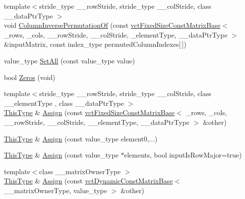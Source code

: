 \begin{DoxyCompactItemize}
\item 
{\footnotesize template$<$stride\+\_\+type \+\_\+\+\_\+row\+Stride, stride\+\_\+type \+\_\+\+\_\+col\+Stride, class \+\_\+\+\_\+data\+Ptr\+Type $>$ }\\void \hyperlink{classvct_fixed_size_matrix_base_a7cc425e8426d9b6e05e73879b0eeb7fc}{Column\+Inverse\+Permutation\+Of} (const \hyperlink{classvct_fixed_size_const_matrix_base}{vct\+Fixed\+Size\+Const\+Matrix\+Base}$<$ \+\_\+rows, \+\_\+cols, \+\_\+\+\_\+row\+Stride, \+\_\+\+\_\+col\+Stride, \+\_\+element\+Type, \+\_\+\+\_\+data\+Ptr\+Type $>$ \&input\+Matrix, const index\+\_\+type permuted\+Column\+Indexes\mbox{[}$\,$\mbox{]})
\item 
value\+\_\+type \hyperlink{classvct_fixed_size_matrix_base_af32801fac5457ee53971dd5732aaaf30}{Set\+All} (const value\+\_\+type value)
\item 
bool \hyperlink{classvct_fixed_size_matrix_base_a28dd9c3f149dbd21dc91943fb51d88f0}{Zeros} (void)
\item 
{\footnotesize template$<$stride\+\_\+type \+\_\+\+\_\+row\+Stride, stride\+\_\+type \+\_\+\+\_\+col\+Stride, class \+\_\+\+\_\+element\+Type , class \+\_\+\+\_\+data\+Ptr\+Type $>$ }\\\hyperlink{classvct_fixed_size_const_matrix_base_a7ec66a96ed7e08ce9ff54093133c9d8d}{This\+Type} \& \hyperlink{classvct_fixed_size_matrix_base_a1bf6174aa97f71d7d33df7a92a368683}{Assign} (const \hyperlink{classvct_fixed_size_const_matrix_base}{vct\+Fixed\+Size\+Const\+Matrix\+Base}$<$ \+\_\+rows, \+\_\+cols, \+\_\+\+\_\+row\+Stride, \+\_\+\+\_\+col\+Stride, \+\_\+\+\_\+element\+Type, \+\_\+\+\_\+data\+Ptr\+Type $>$ \&other)
\item 
\hyperlink{classvct_fixed_size_const_matrix_base_a7ec66a96ed7e08ce9ff54093133c9d8d}{This\+Type} \& \hyperlink{classvct_fixed_size_matrix_base_a6835ab7809fcc7ff91ad04ff138ce427}{Assign} (const value\+\_\+type element0,...)
\item 
\hyperlink{classvct_fixed_size_const_matrix_base_a7ec66a96ed7e08ce9ff54093133c9d8d}{This\+Type} \& \hyperlink{classvct_fixed_size_matrix_base_a9571e59e2042cb27583c223533b2e3d7}{Assign} (const value\+\_\+type $\ast$elements, bool input\+Is\+Row\+Major=true)
\item 
{\footnotesize template$<$class \+\_\+\+\_\+matrix\+Owner\+Type $>$ }\\\hyperlink{classvct_fixed_size_const_matrix_base_a7ec66a96ed7e08ce9ff54093133c9d8d}{This\+Type} \& \hyperlink{classvct_fixed_size_matrix_base_a3c854f9f9e4153d09227eb7d57bd5c41}{Assign} (const \hyperlink{classvct_dynamic_const_matrix_base}{vct\+Dynamic\+Const\+Matrix\+Base}$<$ \+\_\+\+\_\+matrix\+Owner\+Type, value\+\_\+type $>$ \&other)

\end{DoxyCompactItemize}
